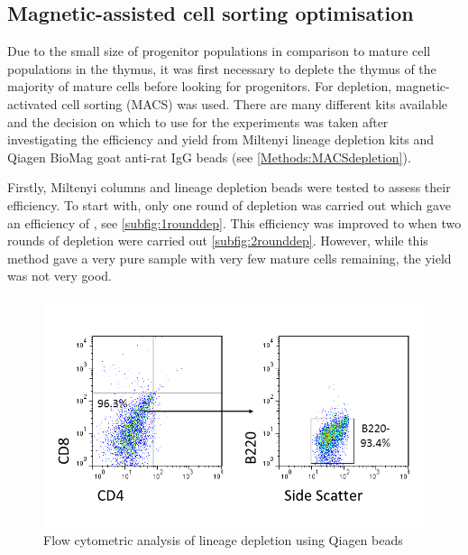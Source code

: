\subsection{Magnetic-assisted cell sorting optimisation}

Due to the small size of progenitor populations in comparison to mature cell populations in the thymus, it was first necessary to deplete the thymus of the majority of mature cells before looking for progenitors.
For depletion, magnetic-activated cell sorting (MACS) was used.
There are many different kits available and the decision on which to use for the experiments was taken after investigating the efficiency and yield from Miltenyi lineage depletion kits and Qiagen BioMag goat anti-rat IgG beads (see \cref{Methods:MACSdepletion}).

Firstly, Miltenyi columns and lineage depletion beads were tested to assess their efficiency.
To start with, only one round of depletion was carried out which gave an efficiency of , see \cref{subfig:1rounddep}.
This efficiency was improved to  when two rounds of depletion were carried out \cref{subfig:2rounddep}. 
However, while this method gave a very pure sample with very few mature cells remaining, the yield was not very good.

\begin{figure}
\includegraphics[width=\textwidth]{Figures/Qiagenbeads.png}
\caption{Flow cytometric analysis of lineage depletion using Qiagen beads}
\label{fig:Qiagenbeads}
\end{figure}

	
